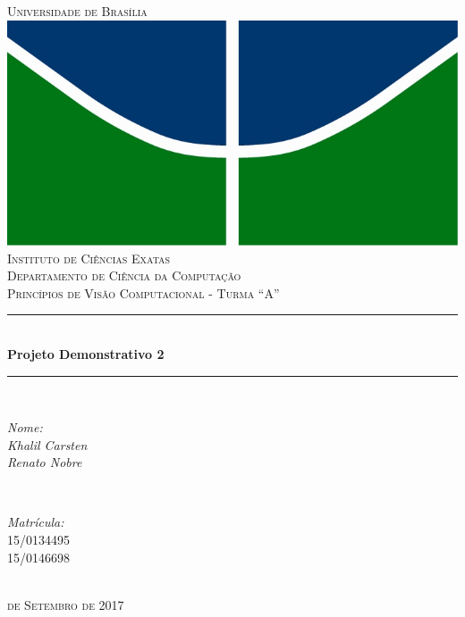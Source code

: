 \documentclass[a4paper, 12pt]{article}
\begin{document}
	\begin{titlepage}

		\newcommand{\HRule}{\rule{\linewidth}{0.5mm}}
		\centering
		\textsc{\LARGE Universidade de Brasília}\\[0.5cm]
		\includegraphics{logo.jpg}\\[0.5cm]
		\textsc{\Large Instituto de Ciências Exatas}\\[0.5cm]
		\textsc{\Large Departamento de Ciência da Computação}\\[0.5cm]
		\textsc{\Large Princípios de Visão Computacional - Turma ``A''}\\[0.5cm]
		\HRule \\[0.4cm]
		{ \huge \bfseries Projeto Demonstrativo 2}\\[0.2cm]
		\HRule \\[3.0cm]
		\begin{minipage}{0.4\textwidth}
			\begin{flushleft} \large
				\emph{Nome:}\\
				\emph{Khalil Carsten}\\
				\emph{Renato Nobre}\\
			\end{flushleft}
		\end{minipage}
		~
		\begin{minipage}{0.4\textwidth}
			\begin{flushright} \large
				\emph{Matrícula:}\\
				\textsc{15/0134495}\\
				\textsc{15/0146698}\\
			\end{flushright}
		\end{minipage}\\[6.0cm]
		\textsc{\large {} de Setembro de 2017}\\
	\end{titlepage}
\end{document}
